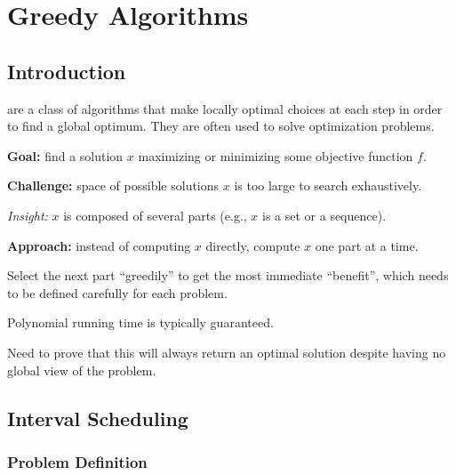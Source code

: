 \chapter{Greedy Algorithms}

\section{Introduction}

 are a class of algorithms that make locally optimal choices at each step in order to find a global optimum. They are often used to solve optimization problems.

\begin{listu}
    \item \textbf{Goal:} find a solution $x$ maximizing or minimizing some objective function $f$. 
    \item \textbf{Challenge:} space of possible solutions $x$ is too large to search exhaustively.
    \item \textit{Insight:} $x$ is composed of several parts (e.g., $x$ is a set or a sequence).
    \item \textbf{Approach:} instead of computing $x$ directly, compute $x$ one part at a time.
    \begin{listu}
        \item Select the next part ``greedily'' to get the most immediate ``benefit'', which needs to be defined carefully for each problem.
        \item Polynomial running time is typically guaranteed.
        \item Need to prove that this will always return an optimal solution despite having no global view of the problem.
    \end{listu}
\end{listu}

\section{Interval Scheduling}

\subsection{Problem Definition}

